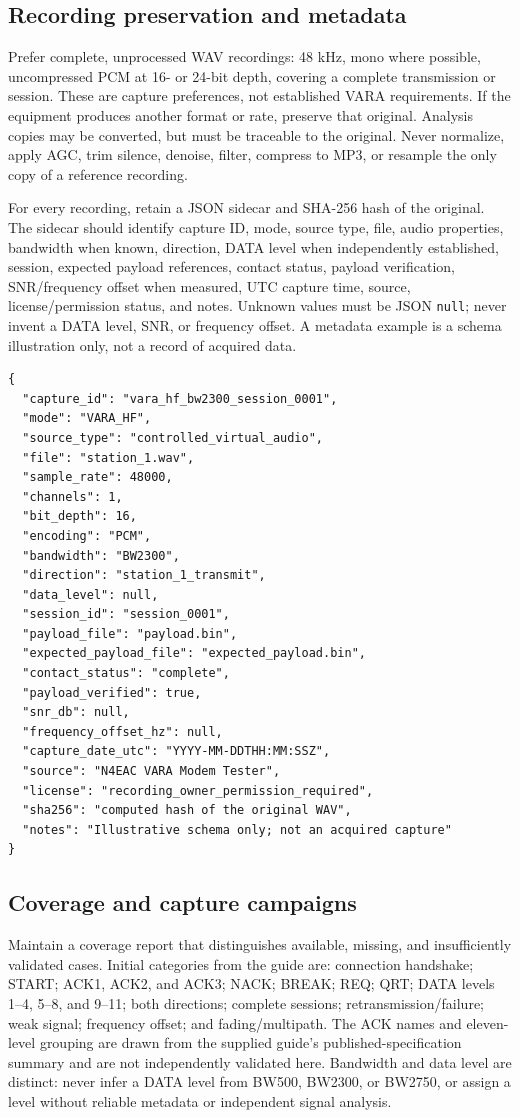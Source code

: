 \documentclass[11pt,a4paper]{article}
\begin{document}
\subsection{Recording preservation and metadata}
Prefer complete, unprocessed WAV recordings: 48 kHz, mono where possible,
uncompressed PCM at 16- or 24-bit depth, covering a complete transmission or
session. These are capture preferences, not established VARA requirements.
If the equipment produces another format or rate, preserve that original.
Analysis copies may be converted, but must be traceable to the original.
Never normalize, apply AGC, trim silence, denoise, filter, compress to MP3, or
resample the only copy of a reference recording.

For every recording, retain a JSON sidecar and SHA-256 hash of the original.
The sidecar should identify capture ID, mode, source type, file, audio
properties, bandwidth when known, direction, DATA level when independently
established, session, expected payload references, contact status, payload
verification, SNR/frequency offset when measured, UTC capture time, source,
license/permission status, and notes. Unknown values must be JSON \texttt{null};
never invent a DATA level, SNR, or frequency offset. A metadata example is a
schema illustration only, not a record of acquired data.

\begin{lstlisting}
{
  "capture_id": "vara_hf_bw2300_session_0001",
  "mode": "VARA_HF",
  "source_type": "controlled_virtual_audio",
  "file": "station_1.wav",
  "sample_rate": 48000,
  "channels": 1,
  "bit_depth": 16,
  "encoding": "PCM",
  "bandwidth": "BW2300",
  "direction": "station_1_transmit",
  "data_level": null,
  "session_id": "session_0001",
  "payload_file": "payload.bin",
  "expected_payload_file": "expected_payload.bin",
  "contact_status": "complete",
  "payload_verified": true,
  "snr_db": null,
  "frequency_offset_hz": null,
  "capture_date_utc": "YYYY-MM-DDTHH:MM:SSZ",
  "source": "N4EAC VARA Modem Tester",
  "license": "recording_owner_permission_required",
  "sha256": "computed hash of the original WAV",
  "notes": "Illustrative schema only; not an acquired capture"
}
\end{lstlisting}

\subsection{Coverage and capture campaigns}
Maintain a coverage report that distinguishes available, missing, and
insufficiently validated cases. Initial categories from the guide are:
connection handshake; START; ACK1, ACK2, and ACK3; NACK; BREAK; REQ; QRT; DATA
levels 1--4, 5--8, and 9--11; both directions; complete sessions;
retransmission/failure; weak signal; frequency offset; and fading/multipath.
The ACK names and eleven-level grouping are drawn from the supplied guide's
published-specification summary and are not independently validated here.
Bandwidth and data level are distinct: never infer a DATA level from BW500,
BW2300, or BW2750, or assign a level without reliable metadata or independent
signal analysis.
\end{document}
